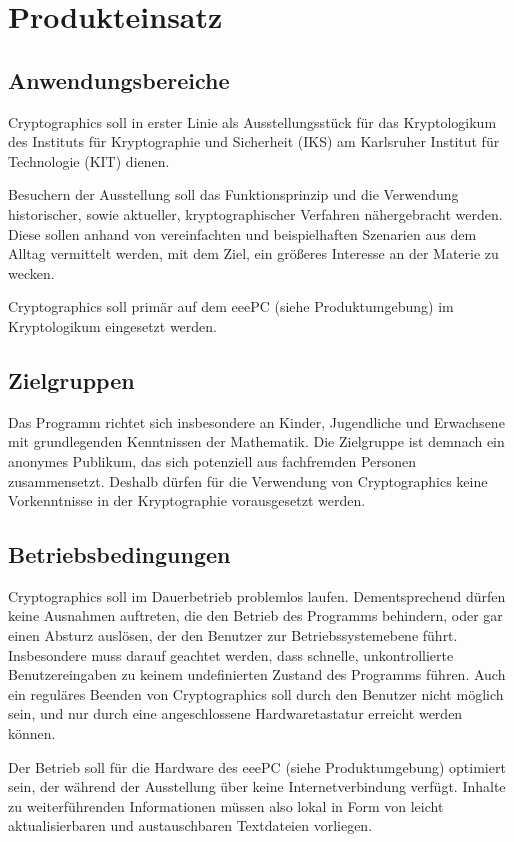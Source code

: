 \documentclass{article}
\begin{document}
\section{Produkteinsatz}
\subsection{Anwendungsbereiche}
\gls{Cryptographics} soll in erster Linie als Ausstellungsstück für das \gls{Kryptologikum} des Instituts für Kryptographie und Sicherheit (\gls{IKS}) am Karlsruher Institut für Technologie (\gls{KIT}) dienen.

Besuchern der Ausstellung soll das Funktionsprinzip und die Verwendung historischer, sowie aktueller, kryptographischer Verfahren nähergebracht werden. Diese sollen anhand von vereinfachten und beispielhaften Szenarien aus dem Alltag vermittelt werden, mit dem Ziel, ein größeres Interesse an der Materie zu wecken.

\gls{Cryptographics} soll primär auf dem eeePC (siehe Produktumgebung) im \gls{Kryptologikum} eingesetzt werden.

\subsection{Zielgruppen}

Das Programm richtet sich insbesondere an Kinder, Jugendliche und Erwachsene mit grundlegenden Kenntnissen der Mathematik. Die Zielgruppe ist demnach ein anonymes Publikum, das sich potenziell aus fachfremden Personen zusammensetzt. Deshalb dürfen für die Verwendung von \gls{Cryptographics} keine Vorkenntnisse in der Kryptographie vorausgesetzt werden.

\subsection{Betriebsbedingungen}

\gls{Cryptographics} soll im Dauerbetrieb problemlos laufen. Dementsprechend dürfen keine Ausnahmen auftreten, die den Betrieb des Programms behindern, oder gar einen Absturz auslösen, der den Benutzer zur Betriebssystemebene führt. Insbesondere muss darauf geachtet werden, dass schnelle, unkontrollierte Benutzereingaben zu keinem undefinierten Zustand des Programms führen. Auch ein reguläres Beenden von \gls{Cryptographics} soll durch den Benutzer nicht möglich sein, und nur durch eine angeschlossene Hardwaretastatur erreicht werden können.

Der Betrieb soll für die Hardware des eeePC (siehe Produktumgebung) optimiert sein, der während der Ausstellung über keine Internetverbindung verfügt. Inhalte zu weiterführenden Informationen müssen also lokal in Form von leicht aktualisierbaren und austauschbaren Textdateien vorliegen.
\end{document}
